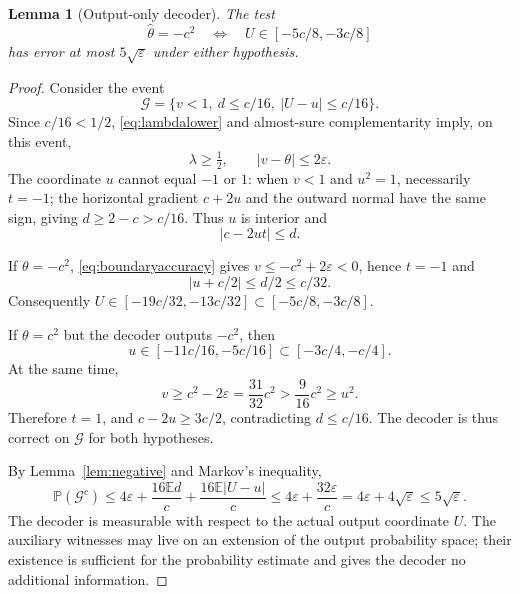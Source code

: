 \documentclass[11pt,a4paper]{article}
\newcommand{\E}{\mathbb E}
\newcommand{\Pp}{\mathbb P}
\newcommand{\eps}{\varepsilon}
\newtheorem{lemma}[theorem]{Lemma}
\theoremstyle{remark}
\numberwithin{equation}{section}
\begin{document}
\begin{lemma}[Output-only decoder]\label{lem:decoder}
The test
\[
 \widehat\theta=-c^2\quad\Longleftrightarrow\quad
 U\in[-5c/8,-3c/8]
\]
has error at most $5\sqrt\eps$ under either hypothesis.
\end{lemma}
\begin{proof}
Consider the event
\[
 \mathcal G=\{v<1,\ d\le c/16,\ |U-u|\le c/16\}.
\]
Since $c/16<1/2$, \eqref{eq:lambdalower} and almost-sure complementarity imply, on this event,
\begin{equation}
 \lambda\ge\tfrac12,\qquad |v-\theta|\le2\eps.
 \label{eq:boundaryaccuracy}
\end{equation}
The coordinate $u$ cannot equal $-1$ or $1$: when $v<1$ and $u^2=1$, necessarily $t=-1$; the horizontal gradient $c+2u$ and the outward normal have the same sign, giving $d\ge2-c>c/16$. Thus $u$ is interior and
\[
 |c-2ut|\le d.
\]

If $\theta=-c^2$, \eqref{eq:boundaryaccuracy} gives $v\le-c^2+2\eps<0$, hence $t=-1$ and
\[
 |u+c/2|\le d/2\le c/32.
\]
Consequently $U\in[-19c/32,-13c/32]\subset[-5c/8,-3c/8]$.

If $\theta=c^2$ but the decoder outputs $-c^2$, then
\[
 u\in[-11c/16,-5c/16]\subset[-3c/4,-c/4].
\]
At the same time,
\[
 v\ge c^2-2\eps=\frac{31}{32}c^2>\frac9{16}c^2\ge u^2.
\]
Therefore $t=1$, and $c-2u\ge3c/2$, contradicting $d\le c/16$. The decoder is thus correct on $\mathcal G$ for both hypotheses.

By Lemma~\ref{lem:negative} and Markov's inequality,
\[
 \Pp(\mathcal G^c)
 \le4\eps+\frac{16\E d}{c}+\frac{16\E|U-u|}{c}
 \le4\eps+\frac{32\eps}{c}
 =4\eps+4\sqrt\eps\le5\sqrt\eps.
\]
The decoder is measurable with respect to the actual output coordinate $U$. The auxiliary witnesses may live on an extension of the output probability space; their existence is sufficient for the probability estimate and gives the decoder no additional information.
\end{proof}
\end{document}
